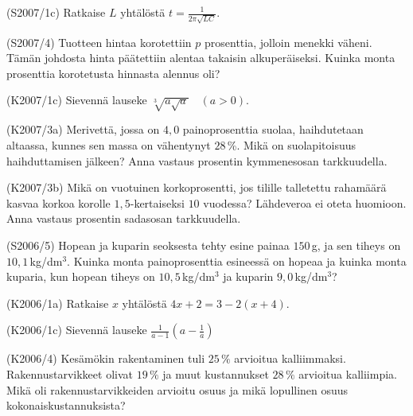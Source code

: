 \begin{tehtava}(S2007/1c) Ratkaise $L$ yhtälöstä $t=\frac{1}{2\pi\sqrt{LC}}$.
\end{tehtava}

\begin{tehtava}(S2007/4) Tuotteen hintaa korotettiin $p$ prosenttia, jolloin menekki väheni. Tämän johdosta hinta päätettiin alentaa takaisin alkuperäiseksi. Kuinka monta prosenttia korotetusta hinnasta alennus oli?
\end{tehtava}

\begin{tehtava}(K2007/1c) Sievennä lauseke $ \sqrt[3]{a \sqrt{a}} \quad (a > 0) $.
\end{tehtava}

\begin{tehtava}(K2007/3a) Merivettä, jossa on $4,0$ painoprosenttia suolaa, haihdutetaan altaassa, kunnes sen massa on vähentynyt $28$\,\%. Mikä on suolapitoisuus haihduttamisen jälkeen? Anna vastaus prosentin kymmenesosan tarkkuudella. 
\end{tehtava}

\begin{tehtava}(K2007/3b) Mikä on vuotuinen korkoprosentti, jos tilille talletettu rahamäärä kasvaa korkoa korolle $1,5$-kertaiseksi $10$ vuodessa? Lähdeveroa ei oteta huomioon. Anna vastaus prosentin sadasosan tarkkuudella.
\end{tehtava}

\begin{tehtava}(S2006/5) Hopean ja kuparin seoksesta tehty esine painaa $150$\,g, ja sen tiheys on $10,1$\,kg/dm$^3$. Kuinka monta painoprosenttia esineessä on hopeaa ja kuinka monta kuparia, kun hopean tiheys on $10,5$\,kg/dm\(^3\) ja kuparin $9,0$\,kg/dm$^3$?
\end{tehtava}

\begin{tehtava}(K2006/1a) Ratkaise $x$ yhtälöstä $4x + 2 =  3 - 2(x + 4)$.
\end{tehtava}

\begin{tehtava}(K2006/1c) Sievennä lauseke 
                        $ \frac{1}{a - 1} \left( a - \frac{1}{a} \right) $
\end{tehtava}

\begin{tehtava}(K2006/4) Kesämökin rakentaminen tuli $25\,\%$ arvioitua kalliimmaksi. Rakennustarvikkeet olivat $19\,\%$ ja muut kustannukset $28\,\% $ arvioitua kalliimpia. Mikä oli rakennustarvikkeiden arvioitu osuus ja mikä lopullinen osuus kokonaiskustannuksista?
\end{tehtava}

